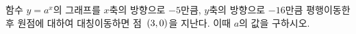 함수 $y=a^{x}$의 그래프를 $x$축의 방향으로 $-5$만큼, $y$축의 방향으로 $-16$만큼 평행이동한 후 원점에 대하여 대칭이동하면 점~$(3{,}\mkern3mu\mathopen{}0)$을 지난다. 이때 $a$의 값을 구하시오. 
